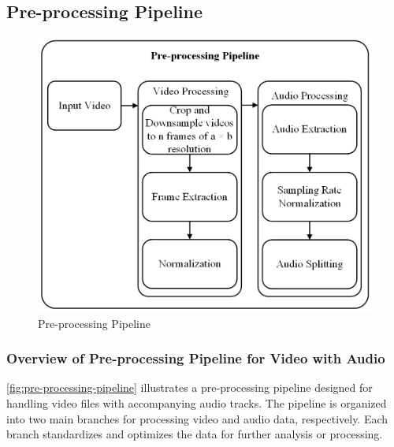 \documentclass{ioereport}
\begin{document}
    \subsection{Pre-processing Pipeline}
    \begin{figure}[H]
        \centering
        \includegraphics[width=0.9\linewidth]{assets/Major Data Pre-Processing.png}
        \caption{Pre-processing Pipeline}
        \label{fig:pre-processing-pipeline}
    \end{figure}
    
    \subsubsection{Overview of Pre-processing Pipeline for Video with Audio}
    \autoref{fig:pre-processing-pipeline} illustrates a pre-processing pipeline designed for handling video files with accompanying audio tracks. The pipeline is organized into two main branches for processing video and audio data, respectively. Each branch standardizes and optimizes the data for further analysis or processing.
    
\end{document}
